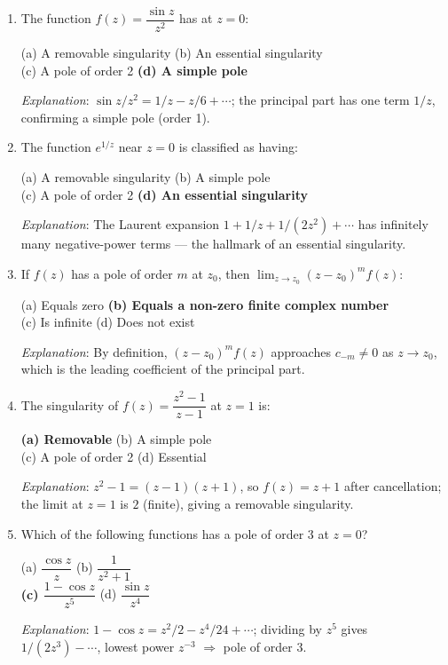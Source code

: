 \documentclass[12pt,a4paper]{article}
\begin{document}
\begin{enumerate}[label=\textbf{Q\arabic*.}, leftmargin=2.5em]

\item The function $f(z) = \dfrac{\sin z}{z^2}$ has at $z = 0$:

  (a) A removable singularity \quad
  (b) An essential singularity \\
  (c) A pole of order 2 \quad
  \textbf{(d) A simple pole}

  \textit{Explanation}: $\sin z / z^2 = 1/z - z/6 + \cdots$; the principal part has one term
  $1/z$, confirming a simple pole (order 1).

\item The function $e^{1/z}$ near $z = 0$ is classified as having:

  (a) A removable singularity \quad
  (b) A simple pole \\
  (c) A pole of order 2 \quad
  \textbf{(d) An essential singularity}

  \textit{Explanation}: The Laurent expansion $1 + 1/z + 1/(2z^2) + \cdots$ has infinitely many
  negative-power terms --- the hallmark of an essential singularity.

\item If $f(z)$ has a pole of order $m$ at $z_0$, then $\lim_{z\to z_0}(z-z_0)^m f(z)$:

  (a) Equals zero \quad
  \textbf{(b) Equals a non-zero finite complex number} \\
  (c) Is infinite \quad
  (d) Does not exist

  \textit{Explanation}: By definition, $(z-z_0)^m f(z)$ approaches $c_{-m} \neq 0$ as $z\to z_0$,
  which is the leading coefficient of the principal part.

\item The singularity of $f(z) = \dfrac{z^2 - 1}{z - 1}$ at $z = 1$ is:

  \textbf{(a) Removable} \quad
  (b) A simple pole \\
  (c) A pole of order 2 \quad
  (d) Essential

  \textit{Explanation}: $z^2 - 1 = (z-1)(z+1)$, so $f(z) = z+1$ after cancellation; the limit
  at $z = 1$ is $2$ (finite), giving a removable singularity.

\item Which of the following functions has a pole of order 3 at $z = 0$?

  (a) $\dfrac{\cos z}{z}$ \quad
  (b) $\dfrac{1}{z^2 + 1}$ \\
  \textbf{(c) $\dfrac{1 - \cos z}{z^5}$} \quad
  (d) $\dfrac{\sin z}{z^4}$

  \textit{Explanation}: $1 - \cos z = z^2/2 - z^4/24 + \cdots$; dividing by $z^5$ gives
  $1/(2z^3) - \cdots$, lowest power $z^{-3}$ $\Rightarrow$ pole of order 3.

\end{enumerate}
\end{document}
